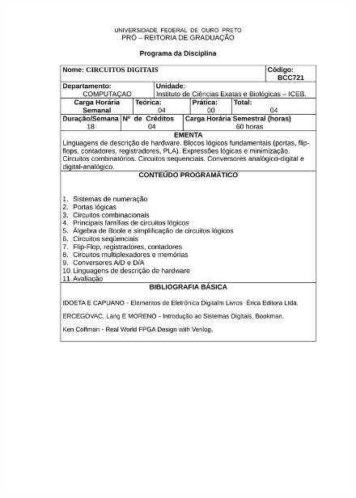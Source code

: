 \begin{figure}[p]
	\centering 
	\includegraphics[scale=0.7]{capitulos/anexo1-programas-disciplina/p52.pdf}
\end{figure}

